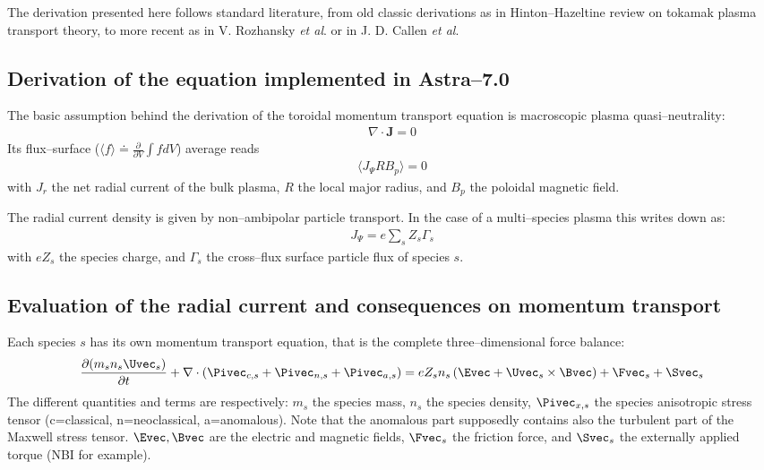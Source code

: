 The derivation presented here follows standard literature, from old classic derivations as in Hinton--Hazeltine review on tokamak plasma transport theory, to more recent as in V. Rozhansky {\it et al}. or in J. D. Callen {\it et al}.
%
\subsection{Derivation of the equation implemented in Astra--7.0}
The basic assumption behind the derivation of the toroidal momentum transport equation is macroscopic plasma quasi--neutrality:
\begin{eqnarray}
\nabla \cdot \mathbf{J} = 0
\label{qneutraldivjeq0}
\end{eqnarray}
Its flux--surface ($\displaystyle \langle f \rangle \doteq \frac{\partial}{\partial{V}}\int{f dV}$) average reads
\begin{eqnarray}
\langle J_\Psi R B_p \rangle=0
\label{qneutraldivjeq0fsa}
\end{eqnarray}
with $J_r$ the
net radial current of the bulk plasma, $R$ the local major radius, and $B_p$ the
poloidal magnetic field.

The radial current density is given by non--ambipolar particle transport. In the case of a multi--species plasma this writes down as:
\begin{eqnarray}
J_\Psi =e\sum_s Z_s \Gamma_s
\label{jpsimultispecpartsum}
\end{eqnarray}
with $e Z_s$ the species charge, and $\Gamma_s$ the cross--flux surface particle flux of species $s$.
%
\subsection{Evaluation of the radial current and consequences on momentum transport}
Each species $s$ has its own momentum transport equation, that is the complete three--dimensional force balance:
\begin{eqnarray}
\frac{\partial(m_s n_s\Uvec_s)}{\partial{t}}+\nabla\cdot\left(\Pivec_{c,s}
+\Pivec_{n,s}+\Pivec_{a,s}\right)=e Z_s n_s \left(\Evec+\Uvec_s\times\Bvec\right) +\Fvec_s+\Svec_s
\label{momtranspeq3d}
\end{eqnarray}
The different quantities and terms are respectively: $m_s$ the species mass, $n_s$ the species density, $\Pivec_{x,s}$
the species anisotropic stress tensor (c=classical, n=neoclassical, a=anomalous). Note that the anomalous part
supposedly contains also the turbulent part of the Maxwell stress tensor. $\Evec,\Bvec$ are the electric and magnetic
fields, $\Fvec_s$ the friction force, and $\Svec_s$ the externally applied torque (NBI for example).

